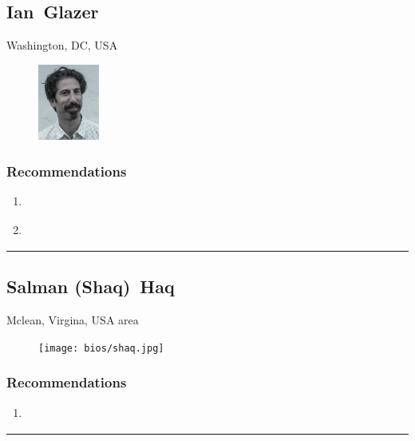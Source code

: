 \subsection{Ian~Glazer} \textsf{Washington, DC, USA} \par \setlength{\columnsep}{0pt} \begin{figure} \centering \includegraphics[width=0.18\textwidth]{bios/iglazer.jpg} \end{figure}  \subsubsection{Recommendations}\begin{enumerate}
\item \cite{Clippinger2007}
\item \cite{Richer2017}
\end{enumerate}\noindent\rule{\textwidth}{0.2pt}

\subsection{Salman (Shaq)~Haq} \textsf{Mclean, Virgina, USA area} \par \setlength{\columnsep}{0pt} \begin{figure} \centering \texttt{[image: bios/shaq.jpg]} \end{figure}  \subsubsection{Recommendations}\begin{enumerate}
\item \cite{Windley2005}
\end{enumerate}\noindent\rule{\textwidth}{0.2pt}

